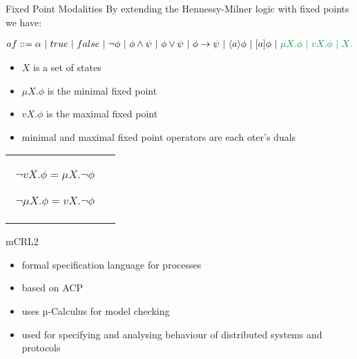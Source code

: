 \documentclass[aspectratio=1610]{beamer}
\begin{document}
  \begin{frame}{Fixed Point Modalities}
    By extending the Hennessy-Milner logic with fixed points we have:
    \resizebox{ \textwidth}{!} {
      \begin{minipage}{\textwidth}
        \begin{align*}
          af ::= \alpha\ |\ true\ |\ false\ |\ \neg \phi\ |\ \phi \land \psi\ |\ \phi \lor \psi\ |\ \phi \to \psi\ |\ \langle a \rangle \phi \ |\ [a]\phi\ |\ \color{green} \mu X. \phi \ |\ vX. \phi \ |\ X.
        \end{align*}
      \end{minipage}
    }
    \begin{itemize}
      \item $X$ is a set of states
      \item $\mu X. \phi$ is the minimal fixed point
      \item $vX. \phi$ is the maximal fixed point
      \item minimal and maximal fixed point operators are each oter's duals
    \end{itemize}
    \begin{tabular}{cc}
      \begin{minipage}{.47\linewidth}
        \begin{align*}
          \neg vX. \phi = \mu X. \neg \phi
        \end{align*}
      \end{minipage}
      \begin{minipage}{.47\linewidth}
        \begin{align*}
          \neg \mu X. \phi = vX. \neg \phi
        \end{align*}
      \end{minipage}
    \end{tabular}
  \end{frame}

  \begin{frame}{mCRL2}
    \begin{itemize}
      \item formal specification language for processes
      \item based on ACP
      \item uses µ-Calculus for model checking
      \item used for specifying and analysing behaviour of distributed systems and protocols
    \end{itemize}
  \end{frame}
\end{document}
